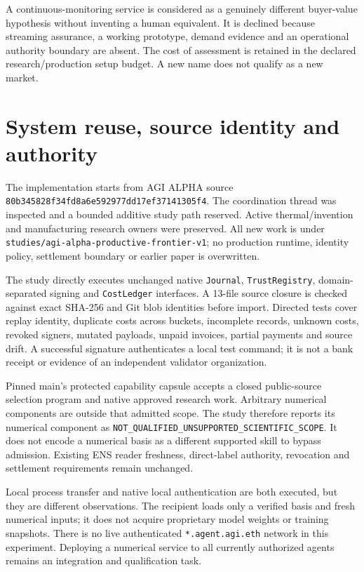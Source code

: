 \documentclass[11pt,letterpaper]{article}
\newcommand{\sourceid}{\texttt{80b345828f34fd8a6e592977dd17ef37141305f4}}
\begin{document}
A continuous-monitoring service is considered as a genuinely different buyer-value hypothesis without inventing a human equivalent. It is declined because streaming assurance, a working prototype, demand evidence and an operational authority boundary are absent. The cost of assessment is retained in the declared research/production setup budget. A new name does not qualify as a new market.

\section{System reuse, source identity and authority}

The implementation starts from AGI ALPHA source \sourceid. The coordination thread was inspected and a bounded additive study path reserved. Active thermal/invention and manufacturing research owners were preserved. All new work is under \texttt{studies/agi-alpha-productive-frontier-v1}; no production runtime, identity policy, settlement boundary or earlier paper is overwritten.

The study directly executes unchanged native \texttt{Journal}, \texttt{TrustRegistry}, domain-separated signing and \texttt{CostLedger} interfaces. A 13-file source closure is checked against exact SHA-256 and Git blob identities before import. Directed tests cover replay identity, duplicate costs across buckets, incomplete records, unknown costs, revoked signers, mutated payloads, unpaid invoices, partial payments and source drift. A successful signature authenticates a local test command; it is not a bank receipt or evidence of an independent validator organization.

Pinned main's protected capability capsule accepts a closed public-source selection program and native approved research work. Arbitrary numerical components are outside that admitted scope. The study therefore reports its numerical component as \texttt{NOT\_QUALIFIED\_UNSUPPORTED\_SCIENTIFIC\_SCOPE}. It does not encode a numerical basis as a different supported skill to bypass admission. Existing ENS reader freshness, direct-label authority, revocation and settlement requirements remain unchanged.

Local process transfer and native local authentication are both executed, but they are different observations. The recipient loads only a verified basis and fresh numerical inputs; it does not acquire proprietary model weights or training snapshots. There is no live authenticated \texttt{*.agent.agi.eth} network in this experiment. Deploying a numerical service to all currently authorized agents remains an integration and qualification task.
\end{document}
